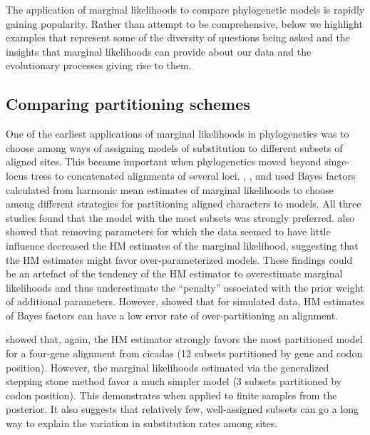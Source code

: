 The application of marginal likelihoods to compare phylogenetic models is
rapidly gaining popularity.
Rather than attempt to be comprehensive, below we highlight examples that
represent some of the diversity of questions being asked and the insights that
marginal likelihoods can provide about our data and the evolutionary processes
giving rise to them.

\subsection{Comparing partitioning schemes}

One of the earliest applications of marginal likelihoods in phylogenetics was
to choose among ways of assigning models of substitution to different subsets
of aligned sites.
This became important when phylogenetics moved beyond singe-locus trees to
concatenated alignments of several loci.
\citet{Mueller2004},
\citet{NylanderEtal2004}, and
\citet{Brandley2005}
used Bayes factors calculated from harmonic mean
estimates of marginal likelihoods to choose among different strategies for
partitioning aligned characters to  models.
All three studies found that the model with the most subsets was strongly
preferred.
\citet{NylanderEtal2004} also showed that removing
parameters for which the data seemed to have little influence decreased the HM
estimates of the marginal likelihood, suggesting that the HM estimates might
favor over-parameterized models.
These findings could be an artefact of the tendency of the HM estimator to 
overestimate marginal likelihoods and thus underestimate the ``penalty''
associated with the prior weight of additional parameters.
However, \citet{Brown2007} showed that for simulated data,
HM estimates of Bayes factors can have a low error rate of over-partitioning an
alignment.

\citet{Fan2011} showed that, again, the HM estimator strongly
favors the most partitioned model for a four-gene alignment from cicadas (12
subsets partitioned by gene and codon position).
However, the marginal likelihoods estimated via the generalized stepping stone
method favor a much simpler model (3 subsets partitioned by codon position).
This demonstrates
 when
applied to finite samples from the posterior.
It also suggests that relatively few, well-assigned subsets can go a long way
to explain the variation in substitution rates among sites.


